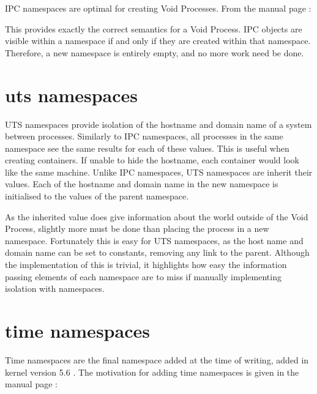 \documentclass[12pt,a4paper,twoside]{report}
\begin{document}
IPC namespaces are optimal for creating Void Processes. From the manual page \citep{free_software_foundation_ipc_namespaces7_2021}:


This provides exactly the correct semantics for a Void Process. IPC objects are visible within a namespace if and only if they are created within that namespace. Therefore, a new namespace is entirely empty, and no more work need be done.


\section{uts namespaces}
\label{sec:voiding-uts}

UTS namespaces provide isolation of the hostname and domain name of a system between processes. Similarly to IPC namespaces, all processes in the same namespace see the same results for each of these values. This is useful when creating containers. If unable to hide the hostname, each container would look like the same machine. Unlike IPC namespaces, UTS namespaces are inherit their values. Each of the hostname and domain name in the new namespace is initialised to the values of the parent namespace.

As the inherited value does give information about the world outside of the Void Process, slightly more must be done than placing the process in a new namespace. Fortunately this is easy for UTS namespaces, as the host name and domain name can be set to constants, removing any link to the parent. Although the implementation of this is trivial, it highlights how easy the information passing elements of each namespace are to miss if manually implementing isolation with namespaces.


\section{time namespaces}
\label{sec:voiding-time}

Time namespaces are the final namespace added at the time of writing, added in kernel version 5.6 \citep{linux_kernel_newbies_editors_linux_2020}. The motivation for adding time namespaces is given in the manual page \citep{free_software_foundation_time_namespaces7_2021}:
\end{document}
